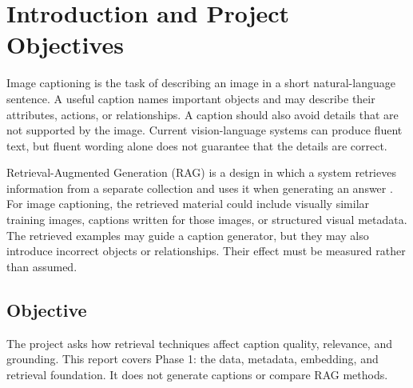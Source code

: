 \section{Introduction and Project Objectives}
\label{ch:introduction}

Image captioning is the task of describing an image in a short natural-language sentence. A useful caption names important objects and may describe their attributes, actions, or relationships. A caption should also avoid details that are not supported by the image. Current vision-language systems can produce fluent text, but fluent wording alone does not guarantee that the details are correct.

Retrieval-Augmented Generation (RAG) is a design in which a system retrieves information from a separate collection and uses it when generating an answer \citep{lewis2020rag}. For image captioning, the retrieved material could include visually similar training images, captions written for those images, or structured visual metadata. The retrieved examples may guide a caption generator, but they may also introduce incorrect objects or relationships. Their effect must be measured rather than assumed.

\subsection{Objective}
The project asks how retrieval techniques affect caption quality, relevance, and grounding. This report covers Phase 1: the data, metadata, embedding, and retrieval foundation. It does not generate captions or compare RAG methods.
